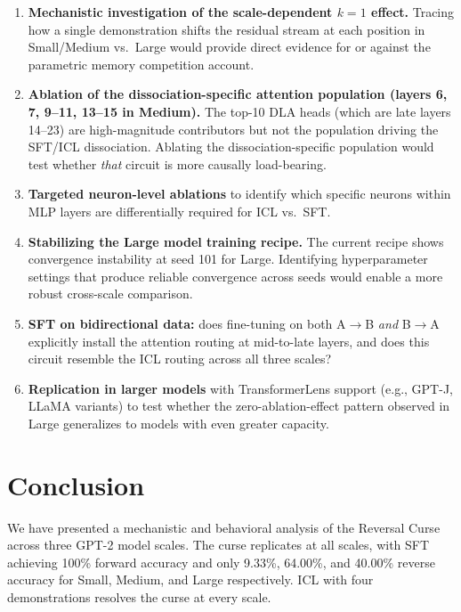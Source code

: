 \documentclass[11pt]{article}
\begin{document}
\begin{enumerate}
  \item \textbf{Mechanistic investigation of the scale-dependent $k=1$
  effect.} Tracing how a single demonstration shifts the residual stream at
  each position in Small/Medium vs.\ Large would provide direct evidence for or
  against the parametric memory competition account.

  \item \textbf{Ablation of the dissociation-specific attention population
  (layers 6, 7, 9--11, 13--15 in Medium).} The top-10 DLA heads (which are late
  layers 14--23) are high-magnitude contributors but not the population driving
  the SFT/ICL dissociation. Ablating the dissociation-specific population would
  test whether \emph{that} circuit is more causally load-bearing.

  \item \textbf{Targeted neuron-level ablations} to identify which specific
  neurons within MLP layers are differentially required for ICL vs.\ SFT.

  \item \textbf{Stabilizing the Large model training recipe.} The current
  recipe shows convergence instability at seed 101 for Large. Identifying
  hyperparameter settings that produce reliable convergence across seeds would
  enable a more robust cross-scale comparison.

  \item \textbf{SFT on bidirectional data:} does fine-tuning on both A$\to$B
  \emph{and} B$\to$A explicitly install the attention routing at mid-to-late
  layers, and does this circuit resemble the ICL routing across all three scales?

  \item \textbf{Replication in larger models} with TransformerLens support
  (e.g., GPT-J, LLaMA variants) to test whether the zero-ablation-effect pattern
  observed in Large generalizes to models with even greater capacity.
\end{enumerate}

\section{Conclusion}
\label{sec:conclusion}

We have presented a mechanistic and behavioral analysis of the Reversal Curse
across three GPT-2 model scales. The curse replicates at all scales, with SFT
achieving 100\% forward accuracy and only 9.33\%, 64.00\%, and 40.00\% reverse
accuracy for Small, Medium, and Large respectively. ICL with four demonstrations
resolves the curse at every scale.
\end{document}

